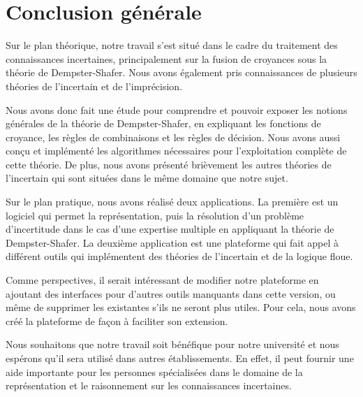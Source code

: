 {}
\chapter*{Conclusion générale}

Sur le plan théorique, notre travail s'est situé dans le cadre du traitement des connaissances incertaines,
principalement sur la fusion de croyances sous la théorie de Dempster-Shafer. Nous avons également pris connaissances
de plusieurs théories de l'incertain et de l'imprécision.

Nous avons donc fait une étude pour comprendre et pouvoir exposer les notions générales de la théorie de Dempster-Shafer,
en expliquant les fonctions de croyance, les règles de combinaisons et les règles de décision. 
Nous avons aussi conçu et implémenté les algorithmes nécessaires pour l'exploitation complète de cette théorie. De plus,
nous avons présenté brièvement les autres théories de l'incertain qui sont situées dans le même domaine que notre sujet.

Sur le plan pratique, nous avons réalisé deux applications. La première est un logiciel qui permet la représentation,
puis la résolution d'un problème d'incertitude dans le cas d'une expertise multiple en appliquant la théorie de
Dempster-Shafer.
La deuxième application est une plateforme qui fait appel à différent outils qui implémentent des théories de
l'incertain et de la logique floue.

Comme perspectives, il serait intéressant de modifier notre plateforme en ajoutant des interfaces pour d'autres outils
manquants dans cette version, ou même de supprimer les existantes s'ils ne seront plus utiles. Pour cela, nous avons créé
la plateforme de façon à faciliter son extension.

Nous souhaitons que notre travail soit bénéfique pour notre université et nous espérons qu'il sera utilisé dans autres
établissements. En effet, il peut fournir une aide importante pour les personnes spécialisées dans le domaine de
la représentation et le raisonnement sur les connaissances incertaines.